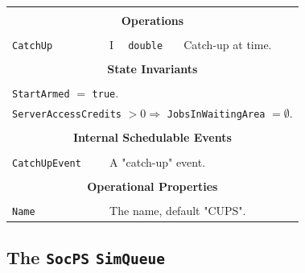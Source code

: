 \documentclass[12pt]{book}
\begin{document}
\begin{tabular}{|l|l|l|l|}
\hline
\multicolumn{4}{|c|}{} \\
\multicolumn{4}{|c|}{\bf Operations} \\
\multicolumn{4}{|c|}{} \\
\hline
\lstinline|CatchUp| & I & \lstinline|double| & Catch-up at time.\\
\hline
\multicolumn{4}{|c|}{} \\
\multicolumn{4}{|c|}{\bf State  Invariants} \\
\multicolumn{4}{|c|}{} \\
\hline
\multicolumn{4}{|l|}{\lstinline|StartArmed| $=$ \lstinline|true|.} \\
\multicolumn{4}{|l|}{\lstinline|ServerAccessCredits| $> 0 \Rightarrow$ \lstinline|JobsInWaitingArea| $= \emptyset$.} \\
\hline
\multicolumn{4}{|c|}{} \\
\multicolumn{4}{|c|}{\bf Internal Schedulable Events} \\
\multicolumn{4}{|c|}{} \\
\hline
\lstinline|CatchUpEvent| & \multicolumn{3}{|l|}{A "catch-up" event.} \\
\hline
\multicolumn{4}{|c|}{} \\
\multicolumn{4}{|c|}{\bf Operational Properties} \\
\multicolumn{4}{|c|}{} \\
\hline
\lstinline|Name| & \multicolumn{3}{|l|}{The name, default "CUPS".} \\
\hline
\end{tabular}

\subsection{The \lstinline{SocPS} \lstinline{SimQueue}}
\label{sec:SocPS}
\end{document}
